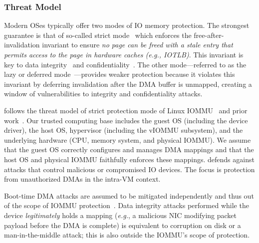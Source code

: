 \subsubsection{Threat Model}
\label{vfree:sec:threat_model}

Modern OSes typically offer two modes of IO memory protection. 
The strongest guarantee is that of so-called strict mode~\cite{nadav2010iommu, Amit2011vIOMMU} 
    which enforces  
    the free-after-invalidation invariant to ensure %
    \emph{no page can be freed with a stale entry 
        that permits access to the page in hardware caches (\textit{e.g.}, IOTLB)}.
This invariant is key to data integrity~\cite{AlexCodeInjection} and confidentiality~\cite{RajapakshaIOMMU}.
The other mode---referred to as the lazy or deferred mode~\cite{RajapakshaIOMMU,AlexCodeInjection}---provides 
    weaker protection because it violates this invariant by
    deferring invalidation after the DMA 
    buffer is unmapped, creating a window of vulnerabilities to integrity and confidentiality attacks.

{\vfreename} follows the threat model of strict protection mode of Linux IOMMU~\cite{nadav2010iommu} and prior work~\cite{markuze2018damn,Amit2011vIOMMU,RajapakshaIOMMU}.
Our trusted computing base includes the guest OS (including the device driver), 
    the host OS, hypervisor (including the vIOMMU subsystem), 
    and the underlying hardware (CPU, memory system, and physical IOMMU).
We assume that the guest OS correctly configures and manages DMA mappings
    and that the host OS and physical IOMMU faithfully enforces these mappings.
{\vfreename} defends against attacks that control malicious or compromised IO devices.
The focus is protection from unauthorized DMAs in the intra-VM context.


Boot-time DMA attacks are assumed to be mitigated independently and 
    thus out of the scope of IOMMU protection~\cite{markuze2018damn}.
Data integrity attacks performed while the device \emph{legitimately} 
    holds a mapping (\textit{e.g.}, a malicious NIC modifying packet payload before the DMA is complete) 
    is equivalent to corruption on disk or a man-in-the-middle attack; 
    this is also outside the IOMMU's scope of protection.

